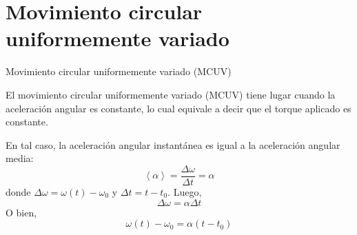 \documentclass[11pt,handout,aspectratio=1610]{beamer}
\newcommand{\fdiff}[2]{\dfrac{\text{d} #1}{\text{d} #2}}
\newcommand{\valmed}[1]{\left\langle #1 \right\rangle}
\newcommand{\vs}{\vspace{11pt}}
\newcommand{\un}[1]{\text{#1}}
\begin{document}



\section[MCUV]{Movimiento circular uniformemente variado}

\begin{frame}{Movimiento circular uniformemente variado (MCUV)}

El movimiento circular uniformemente variado (MCUV) tiene lugar cuando la aceleración angular es constante, lo cual equivale a decir que el torque aplicado es constante.

\vs

En tal caso, la aceleración angular instantánea es igual a la aceleración angular media: $$\valmed{\alpha} = \frac{\Delta \omega}{\Delta t} = \alpha$$ donde $\Delta \omega = \omega(t) - \omega_0$ y $\Delta t = t - t_0$. Luego, $$\Delta \omega = \alpha \Delta t$$ O bien, $$\omega(t) - \omega_0 = \alpha \left(t - t_0\right)$$

\end{frame}
\end{document}
